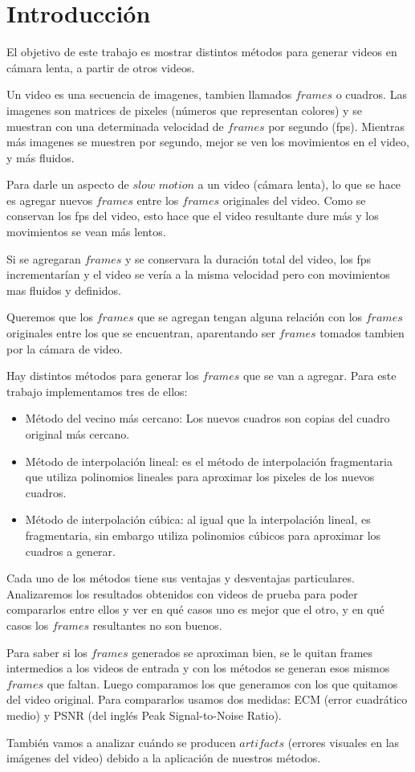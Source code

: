 \section{Introducción}

El objetivo de este trabajo es mostrar distintos métodos para generar videos en cámara lenta, a partir de otros videos.


Un video es una secuencia de imagenes, tambien llamados $frames$ o cuadros.  Las imagenes son matrices de pixeles (números que representan colores) y se muestran con una determinada velocidad de $frames$ por segundo (fps). Mientras más imagenes se muestren por segundo, mejor se ven los movimientos en el video, y más fluidos.


Para darle un aspecto de $slow$ $motion$ a un video (cámara lenta), lo que se hace es agregar nuevos $frames$ entre los $frames$ originales del video. Como se conservan los fps del video, esto hace que el video resultante dure más y los movimientos se vean más lentos. 

Si se agregaran $frames$ y se conservara la duración total del video, los fps incrementarían y el video se vería a la misma velocidad pero con movimientos mas fluidos y definidos.

 Queremos que los $frames$ que se agregan tengan alguna relación con los $frames$ originales entre los que se encuentran, aparentando ser $frames$ tomados tambien por la cámara de video.

Hay distintos métodos para generar los $frames$ que se van a agregar. Para este trabajo implementamos tres de ellos:

\begin{itemize}
\item Método del vecino más cercano: Los nuevos cuadros son copias del cuadro original más cercano.
\item Método de interpolación lineal: es el método de interpolación fragmentaria que utiliza polinomios lineales para aproximar los pixeles de los nuevos cuadros.
\item Método de interpolación cúbica: al igual que la interpolación lineal, es fragmentaria, sin embargo utiliza polinomios cúbicos para aproximar los cuadros a generar.
\end{itemize}

 Cada uno de los métodos tiene sus ventajas y desventajas particulares. Analizaremos los resultados obtenidos con videos de prueba para poder compararlos entre ellos y ver en qué casos uno es mejor que el otro, y en qué casos los $frames$ resultantes no son buenos.

 Para saber si los $frames$ generados se aproximan bien, se le quitan frames intermedios a los videos de entrada y con los métodos se generan esos mismos $frames$ que faltan. Luego comparamos los que generamos con los que quitamos del video original. Para compararlos usamos dos medidas: ECM (error cuadrático medio) y PSNR (del inglés Peak Signal-to-Noise Ratio).

 También vamos a analizar cuándo se producen $artifacts$ (errores visuales en las imágenes del video) debido a la aplicación de nuestros métodos. 
